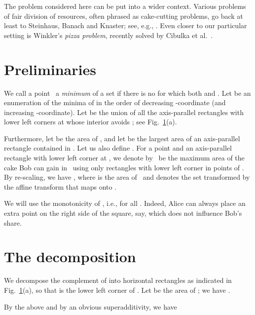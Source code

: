 \documentclass[11pt]{article}
\begin{document}
The problem considered here can be put into a wider context.
Various problems of fair division of resources, often phrased
as cake-cutting problems, go back at least to Steinhaus, Banach and Knaster;
see, e.g., \cite{RW98}. Even closer to our particular setting
is Winkler's \emph{pizza problem}, recently solved by 
Cibulka et al.~\cite{CKMS10}.  



\section{Preliminaries} 
We call a point~ a \emph{minimum} of a set 
if there is no  for which both 
 and . 
Let  be an enumeration
of the minima of  in the order
of decreasing -coordinate (and increasing -coordinate).
Let  be the union of all the axis-parallel rectangles
with lower left corners at  whose interior avoids ;
see Fig.~\ref{f:sta}(a).


\begin{figure}[tbh]
\centering
{}
\qquad
{}
\caption{\label{f:sta}}
\end{figure}





Furthermore, let  be the area of , and let  be the largest
area of an axis-parallel rectangle contained in .
Let us also define .
For a point  and an axis-parallel rectangle 
 with lower left corner at , we denote by~ be the maximum area
of the cake Bob can gain in~ using only rectangles
with lower left corner in points of .
By re-scaling, we have ,
where  is the area of~ and  denotes the set 
transformed by the affine transform that maps  onto .

We will use the monotonicity of , i.e.,
 for all .
Indeed, Alice can always place an extra point on the right side
of the square, say, which does not influence Bob's share.


\section{The decomposition} We decompose the complement of 
into horizontal rectangles  as indicated
in Fig.~\ref{f:sta}(a), so that  is the lower left
corner of . Let  be the area of ;
we have .

By the above and by an obvious superadditivity, we have
\end{document}
